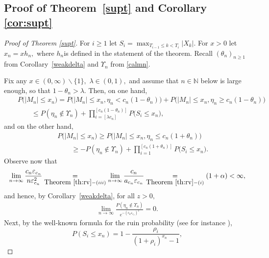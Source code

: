 \documentclass[12pt]{amsart}
\begin{document}
\subsection{Proof of Theorem~\ref{supt} and Corollary \ref{cor:supt}}
\label{supr}
\begin{proof}[Proof of Theorem \ref{supt}]
For $i\ge 1$ let $S_i = \max_{T_{i-1} \le k < T_{i}} |X_k|$. For $x>0$ let $x_n =x h_n,$ where
$h_n$is defined in the statement of the theorem. Recall $(\theta_n)_{n\geq 1}$ from Corollary~\ref{weakdelta}
and $\Upsilon_n$ from \eqref{calmn}.
\par
Fix any $x\in (0,\infty)\backslash\{1\},$ $\lambda\in (0,1),$ and
assume that $n\in{{\mathbb N}}$ below is large enough, so that
$1-\theta_n>\lambda.$ Then, on one hand, \begin{eqnarray} \nonumber &&
P\bigl(|M_n| \leq x_n \bigr)= P\bigl(|M_n| \leq x_n,\eta_n
<c_n(1-\theta_n)\bigr) + P\bigl(|M_n| \leq x_n,\eta_n \geq
c_n(1-\theta_n) \bigr)
\\
\label{hand}
&&
\qquad
\leq
P(\eta_n\not\in\Upsilon_n)+\prod_{i=[\lambda c_n]}^{[c_n(1-\theta_n)]}P\bigl(S_i \leq x_n\bigr),
\end{eqnarray}
and on the other hand,
\begin{eqnarray}
\nonumber
&&
P\bigl(|M_n| \leq x_n \bigr) \geq P\bigl(|M_n| \leq x_n,\eta_n \leq c_n(1+\theta_n)\bigr)
\\
\label{hand1} && \qquad \geq
-P(\eta_n\not\in\Upsilon_n)+\prod_{i=1}^{[c_n(1+\theta_n)]}
P\bigl(S_i \leq x_n\bigr). \end{eqnarray} Observe now that \begin{eqnarray*}
\label{eq:niceandgood} \lim_{n\to\infty} \frac{c_n{\varepsilon}_{c_{n}}}{n
{\varepsilon}_{c_{n}}^2} \underset{\mbox{Theorem }\ref{th:rv}-(iii)}{=}
\lim_{n\to\infty} \frac{c_n
}{a_{c_n}{\varepsilon}_{c_{n}}}\underset{\mbox{Theorem }\ref{th:rv}-(i)}{=}
(1+\alpha) <\infty, \end{eqnarray*} and hence, by Corollary~\ref{weakdelta},
for all $z>0,$  \begin{eqnarray} \label{finale} \lim_{n\to\infty}
{\frac {\displaystyle {P(\eta_n\not\in\Upsilon_n)}}{\displaystyle {e^{-(c_n {\varepsilon}_{c_{n}})^z}} }}=0.
\end{eqnarray} Next, by the well-known formula for the ruin probability (see
for instance \cite[p.~274]{durrett}),
\begin{equation}
\label{eq:alternative}
P(S_i \le x_n)= 1- \frac{\rho_i}{(1+\rho_i)^{x_n}-1},
\end{equation}

\end{proof}
\end{document}
